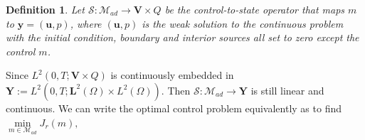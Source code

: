 \documentclass{amsart}
\newtheorem{definition}{Definition}[section]
\newcommand{\LRp}[1]{\left( #1 \right)}
\newcommand{\LRa}[1]{\left< #1 \right>}
\begin{document}
\begin{definition}
	Let $\mathcal{S}:\mathcal{M}_{ad} \rightarrow \boldsymbol{V} \times Q$ be the control-to-state operator that maps $m$ to $\boldsymbol{y}=(\boldsymbol{u},p)$, where $(\boldsymbol{u},p)$ is the weak solution to the continuous problem with the initial condition, boundary and interior sources all set to zero except the control $m$.
\end{definition}
Since $L^{2}(0,T;\boldsymbol{V} \times Q)$ is continuously embedded in $\boldsymbol{Y} := L^{2}(0,T;\boldsymbol{L}^2(\Omega) \times L^2(\Omega))$. Then $\mathcal{S}:\mathcal{M}_{ad} \rightarrow \boldsymbol{Y}$ is still linear and continuous. We can write the optimal control problem equivalently as to find $\underset{m \in \mathcal{M}_{ad}}{\min} J_r(m),$
\end{document}

